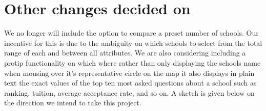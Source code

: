 \documentclass[11pt, a4paper]{article}
\begin{document}
\section{Other changes decided on}

We no longer will include the option to compare a preset number of schools. Our incentive for this is due to the ambiguity on which schools to select from the total range of each and between all attributes. We are also considering including a protip functionality on which where rather than only displaying the schools name when mousing over it's representative circle on the map it also displays in plain text the exact values of the top ten most asked questions about a school such as ranking, tuition, average acceptance rate, and so on. A sketch is given below on the direction we intend to take this project.

\begin{figure}[h]
\label{Redesigned Project Visualization}
\end{figure}
\end{document}
